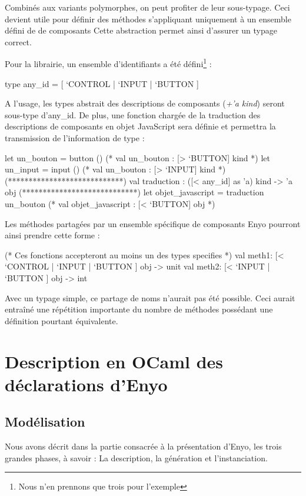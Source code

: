 \documentclass[11pt,a4paper]{report}
\begin{document}
Combinés aux variants polymorphes, on peut profiter de leur sous-typage.
Ceci devient utile pour définir des méthodes s'appliquant uniquement à un ensemble défini de de composants
Cette abstraction permet ainsi d'assurer un typage correct.

Pour la librairie, un ensemble d'identifiants a été défini\footnote{Nous n'en prennons que 
trois pour l'exemple} :

\begin{OCaml}
  type any_id = [ `CONTROL | `INPUT | `BUTTON ]
\end{OCaml}

A l'usage, les types abstrait des descriptions de composants (\emph{+'a kind}) seront sous-type d'any\_id.
De plus, une fonction chargée de la traduction des descriptions de composants en objet JavaScript sera définie et 
permettra la transmission de l'information de type :

\begin{OCaml}
  let un_bouton = button ()
  (* val un_bouton : [> `BUTTON] kind *)
  let un_input = input ()
  (* val un_bouton : [> `INPUT] kind *)
  (****************************)
  val traduction : ([< any_id] as 'a) kind -> 'a obj
  (****************************)
  let objet_javascript = traduction un_bouton
  (* val objet_javascript : [< `BUTTON] obj *)
\end{OCaml}

Les méthodes partagées par un ensemble spécifique de composants Enyo pourront ainsi prendre cette forme :
\begin{OCaml}
  (* Ces fonctions accepteront au moins un des types specifies *) 
  val meth1: [< `CONTROL | `INPUT | `BUTTON ] obj -> unit
  val meth2: [< `INPUT | `BUTTON ] obj -> int
\end{OCaml}

Avec un typage simple, ce partage de noms n'aurait pas été possible. Ceci aurait entraîné une
répétition importante du nombre de méthodes possédant une définition pourtant équivalente.

\section{Description en OCaml des déclarations d'Enyo}
\subsection{Modélisation}

Nous avons décrit dans la partie consacrée à la présentation d'Enyo, les trois grandes phases, à savoir :
La description, la génération et l'instanciation.
\end{document}

